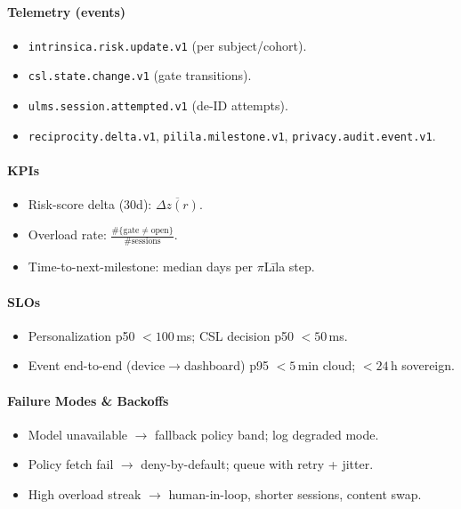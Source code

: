 \documentclass[11pt]{article}
\theoremstyle{plain}
\begin{document}
\paragraph{Telemetry (events)}
\begin{itemize}
  \item \texttt{intrinsica.risk.update.v1} (per subject/cohort).
  \item \texttt{csl.state.change.v1} (gate transitions).
  \item \texttt{ulms.session.attempted.v1} (de-ID attempts).
  \item \texttt{reciprocity.delta.v1}, \texttt{pilila.milestone.v1}, \texttt{privacy.audit.event.v1}.
\end{itemize}

\paragraph{KPIs}
\begin{itemize}
  \item Risk-score delta (30d): $\overline{\Delta z(r)}$.
  \item Overload rate: $\frac{\#\{\text{gate}\neq\mathrm{open}\}}{\#\text{sessions}}$.
  \item Time-to-next-milestone: median days per $\pi$Līla step.
\end{itemize}

\paragraph{SLOs}
\begin{itemize}
  \item Personalization p50 $<100$\,ms; CSL decision p50 $<50$\,ms.
  \item Event end-to-end (device$\rightarrow$dashboard) p95 $<5$\,min cloud; $<24$\,h sovereign.
\end{itemize}

\paragraph{Failure Modes \& Backoffs}
\begin{itemize}
  \item Model unavailable $\rightarrow$ fallback policy band; log degraded mode.
  \item Policy fetch fail $\rightarrow$ deny-by-default; queue with retry + jitter.
  \item High overload streak $\rightarrow$ human-in-loop, shorter sessions, content swap.
\end{itemize}
\end{document}
